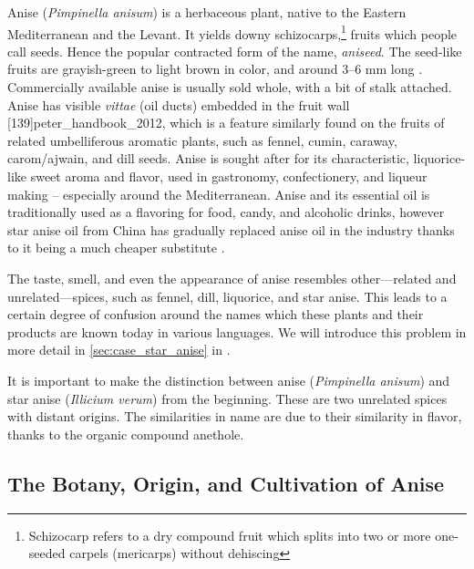 Anise (\textit{Pimpinella anisum}) is a herbaceous plant, native to the Eastern Mediterranean and the Levant. It yields downy schizocarps,\footnote{Schizocarp refers to a dry compound fruit which splits into two or more one-seeded carpels (mericarps) without dehiscing} fruits which people call seeds. Hence the popular contracted form of the name, \textit{aniseed}. The seed-like fruits are grayish-green to light brown in color, and around 3--6 mm long \autocite[212]{van_wyk_culinary_2014}. Commercially available anise is usually sold whole, with a bit of stalk attached. Anise has visible \textit{vittae} (oil ducts) embedded in the fruit wall [139]{peter_handbook_2012}, which is a feature similarly found on the fruits of related umbelliferous aromatic plants, such as fennel, cumin, caraway, carom/ajwain, and dill seeds.
Anise is sought after for its characteristic, liquorice-like sweet aroma and flavor, used in gastronomy, confectionery, and liqueur making -- especially around the Mediterranean. 
Anise and its essential oil is traditionally used as a flavoring for food, candy, and alcoholic drinks, however star anise oil from China has gradually replaced anise oil in the industry thanks to it being a much cheaper substitute \autocite[212]{van_wyk_culinary_2014}. %

The taste, smell, and even the appearance of anise resembles other---related and unrelated---spices, such as fennel, dill, liquorice, and star anise. This leads to a certain degree of confusion around the names which these plants and their products are known today in various languages. We will introduce this problem in more detail in \cref{sec:case_star_anise} in .

\begin{note}
	It is important to make the distinction between anise (\textit{Pimpinella anisum}) and star anise (\textit{Illicium verum}) from the beginning. These are two unrelated spices with distant origins. The similarities in name are due to their similarity in flavor, thanks to the organic compound anethole. 
	\end{note}

\subsection{The Botany, Origin, and  Cultivation of Anise}

